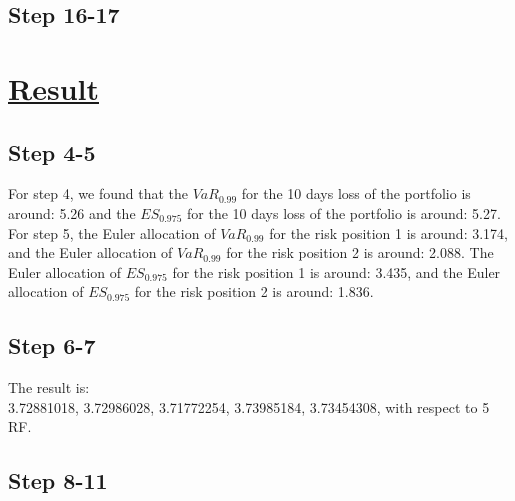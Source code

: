 \documentclass{article}
\begin{document}
\subsection*{Step 16-17}
\section*{\underline{Result}}

\subsection*{Step 4-5}
For step 4, we found that the $VaR_{0.99}$ for the 10 days loss of the portfolio is around: 5.26 and the $ES_{0.975}$ for the 10 days loss of the portfolio is around: 5.27.
\\For step 5, the Euler allocation of $VaR_{0.99}$ for the risk position 1 is around: 3.174, and the Euler allocation of $VaR_{0.99}$ for the risk position 2 is around: 2.088. The Euler allocation of $ES_{0.975}$ for the risk position 1 is around: 3.435, and the Euler allocation of $ES_{0.975}$ for the risk position 2 is around: 1.836.
\subsection*{Step 6-7}
The result is:\\
3.72881018, 3.72986028, 3.71772254, 3.73985184, 3.73454308, with respect to 5 RF.

\subsection*{Step 8-11}
\end{document}
